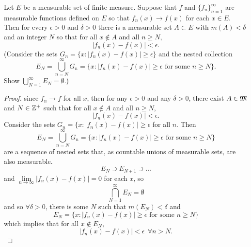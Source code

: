 \begin{pblm}\label{p:approxfunwithsteporsimple}%
	Let $E$ be a measurable set of finite measure. Suppose that $f$ and 
	$\{f_n\}_{n=1}^\infty$ are measurable functions defined on $E$ so that 
	$f_n(x) \rightarrow f(x)$ for each $x \in E$. Then for every $\epsilon > 0$ 
	and $\delta > 0$ there is a measurable set $A \subset E$ with 
	$m(A) < \delta$ and an integer $N$ so that for all $x \notin A$ and all 
	$n \ge N$, 
	\begin{equation*}
		|f_n(x) - f(x)| < \epsilon.
	\end{equation*}
	(Consider the sets $G_n = \{x: |f_n(x) - f(x)|\ge\epsilon\}$ and the 
	nested collection 
	\begin{equation*}
		E_N = \bigcup\limits_{n=N}^\infty G_n = 
		\{x: |f_n(x) - f(x)| \ge \epsilon \text{ for some }n \ge N\}. 
	\end{equation*}
	Show $\bigcup\limits_{N=1}^\infty E_N = \emptyset$.)
\begin{proof}
	since $f_n \rightarrow f$ for all $x$, then for any $\epsilon > 0$ and 
	any $\delta > 0$, there exist $A \in \mathfrak{M}$ and $N \in \mathbb{Z}^+$ such that 
	for all $x \notin A$ and all $n \ge N$, 
	\begin{equation*}
		|f_n(x) - f(x)| < \epsilon. 
	\end{equation*}
	Consider the sets $G_n = \{x: |f_n(x) - f(x) | \ge \epsilon$ for all $n$.
	Then 
	\begin{equation*}
		E_N = \bigcup\limits_{n=N}^\infty G_n = 
		\{x : |f_n(x) - f(x)| \ge \epsilon \text{ for some }n \ge N\} 
	\end{equation*}
	are a sequence of nested sets that, as countable 
	unions of measurable sets, are also measurable. 
	\begin{equation*}
		E_N \supset E_{N+1} \supset \dots
	\end{equation*}
	and $\lim\limits_{n\to\infty}|f_n(x) - f(x)| = 0$ for each $x$, so 
	\begin{equation*}
		\bigcap\limits_{N=1}^\infty E_N = \emptyset
	\end{equation*}
	and so $\forall \delta > 0$, there is some $N$ such that $m(E_N) < \delta$ 
	and 
	\begin{equation*}
		E_N = \{x: |f_n(x) - f(x)| \ge \epsilon \text{ for some } n \ge N\}
	\end{equation*}
	which implies that for all $x \notin E_N$, 
	\begin{equation*}
		|f_n(x) - f(x)| < \epsilon ~~\forall n > N.
	\end{equation*}
\end{proof}
\end{pblm}

